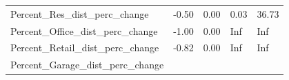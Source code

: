 \documentclass[]{article}
\begin{document}
\begin{longtable}[]{@{}lllll@{}}
\begin{minipage}[t]{0.49\columnwidth}
Percent\_Res\_dist\_perc\_change\strut
\end{minipage} & \begin{minipage}[t]{0.08\columnwidth}\raggedright\strut
-0.50\strut
\end{minipage} & \begin{minipage}[t]{0.09\columnwidth}\raggedright\strut
0.00\strut
\end{minipage} & \begin{minipage}[t]{0.09\columnwidth}\raggedright\strut
0.03\strut
\end{minipage} & \begin{minipage}[t]{0.11\columnwidth}\raggedright\strut
36.73\strut
\end{minipage}\tabularnewline
\begin{minipage}[t]{0.49\columnwidth}\raggedright\strut
Percent\_Office\_dist\_perc\_change\strut
\end{minipage} & \begin{minipage}[t]{0.08\columnwidth}\raggedright\strut
-1.00\strut
\end{minipage} & \begin{minipage}[t]{0.09\columnwidth}\raggedright\strut
0.00\strut
\end{minipage} & \begin{minipage}[t]{0.09\columnwidth}\raggedright\strut
Inf\strut
\end{minipage} & \begin{minipage}[t]{0.11\columnwidth}\raggedright\strut
Inf\strut
\end{minipage}\tabularnewline
\begin{minipage}[t]{0.49\columnwidth}\raggedright\strut
Percent\_Retail\_dist\_perc\_change\strut
\end{minipage} & \begin{minipage}[t]{0.08\columnwidth}\raggedright\strut
-0.82\strut
\end{minipage} & \begin{minipage}[t]{0.09\columnwidth}\raggedright\strut
0.00\strut
\end{minipage} & \begin{minipage}[t]{0.09\columnwidth}\raggedright\strut
Inf\strut
\end{minipage} & \begin{minipage}[t]{0.11\columnwidth}\raggedright\strut
Inf\strut
\end{minipage}\tabularnewline
\begin{minipage}[t]{0.49\columnwidth}\raggedright\strut
Percent\_Garage\_dist\_perc\_change\strut

\end{minipage}
\end{longtable}
\end{document}
